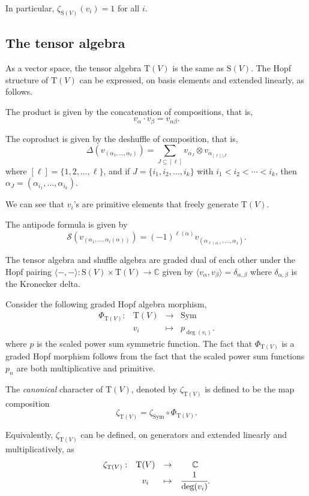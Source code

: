 \documentclass[12pt]{amsart}
\numberwithin{equation}{section}
\newcommand{\Sym}{\mathrm{Sym}}
\newcommand{\rmT}{\mathrm{T}}
\newcommand{\rmS}{\mathrm{S}}
\begin{document}
In particular, $\zeta_{\rmS(V)}(v_i)=1$ for all $i$.


\subsection{The tensor algebra}
As a vector space, the tensor algebra $\rmT(V)$ is the same as $\rmS(V)$. The Hopf structure of $\rmT(V)$ can be expressed, on basis elements and extended linearly, as follows.

The product is given by the concatenation of compositions, that is,
$$v_\alpha\cdot v_\beta=v_{\alpha\beta}.$$

The coproduct is given by the deshuffle of composition, that is,
$$\Delta(v_{(\alpha_1,\dots,\alpha_\ell)})=\sum_{J\subseteq[\ell]}v_{\alpha_J}\otimes v_{\alpha_{[\ell]\setminus J}}$$
where $[\ell]=\{1,2,\dots,\ell\}$, and if $J=\{i_1,i_2,\dots,i_k\}$ with $i_1<i_2<\cdots<i_k$, then $\alpha_J=(\alpha_{i_1},\dots,\alpha_{i_k})$.

We can see that $v_i$'s are primitive elements that freely generate $\rmT(V)$.

The antipode formula is given by
$$\mathcal{S}(v_{(\alpha_1,\dots,\alpha_\ell(\alpha))})=(-1)^{\ell(\alpha)}v_{(\alpha_{\ell(\alpha)},\dots,\alpha_1)}.$$

The tensor algebra and shuffle algebra are graded dual of each other under the Hopf pairing $\langle -,-\rangle:\rmS(V)\times\rmT(V)\to\mathbb{C}$ given by $\langle v_\alpha,v_\beta\rangle=\delta_{\alpha,\beta}$ where $\delta_{\alpha,\beta}$ is the Kronecker delta.

Consider the following graded Hopf algebra morphism,
$$\begin{array}{cccc}
\Phi_{\rmT(V)}:&\rmT(V)&\rightarrow& \Sym\\
 & v_i & \mapsto & p_{\deg(v_i)}.
\end{array}$$
where $p$ is the scaled power sum symmetric function. The fact that $\Phi_{\rmT(V)}$ is a graded Hopf morphism follows from the fact that the scaled power sum functions $p_n$ are both multiplicative and primitive.

The \textit{canonical} character of $\rmT(V)$, denoted by $\zeta_{\rmT(V)}$ is defined to be the map composition
$$\zeta_{\rmT(V)}=\zeta_{\Sym}\circ\Phi_{\rmT(V)}.$$

Equivalently, $\zeta_{\rmT(V)}$ can be defined, on generators and extended linearly and multiplicatively, as
$$\begin{array}{cccc}
\zeta_{\rmT(V)}:&\rmT(V)&\rightarrow& \mathbb{C}\\
& v_i & \mapsto & \cfrac{1}{\deg(v_i)}.
\end{array}$$
\end{document}
